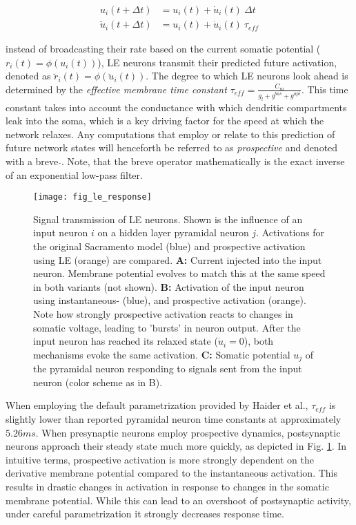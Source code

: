 \begin{align}
  u_i(t+ \Delta t)          & = u_i(t) + \dot{u}_i(t) \ \Delta t \label{eq-r-t-sacramento} \\
  \breve{u}_i(t + \Delta t) & = u_i(t) + \dot{u}_i(t) \ \tau_{eff} \label{eq-r-t-haider}
\end{align}

instead of broadcasting their rate based on the current somatic potential ($r_i(t) = \phi(u_i(t))$), LE neurons transmit
their predicted future activation, denoted as $\breve{r}_i(t) = \phi(\breve{u}_i(t))$. The degree to which LE neurons
look ahead is determined by the \textit{effective membrane time constant} $\tau_{eff} = \frac{C_m}{g_l + g^{bas} +
g^{api}}$. This time constant takes into account the conductance with which dendritic compartments leak into the soma,
which is a key driving factor for the speed at which the network relaxes. Any computations that employ or relate to this
prediction of future network states will henceforth be referred to as \textit{prospective} and denoted with a breve
$\breve{}$. Note, that the breve operator mathematically is the exact inverse of an exponential low-pass filter.


\begin{figure}[h!]
  \centering
  \texttt{[image: fig\_le\_response]}
  \caption[Signal transmission of LE neurons]{Signal transmission of LE neurons. Shown is the influence of an input
    neuron $i$ on a hidden layer pyramidal neuron $j$. Activations for the original Sacramento model (blue) and
    prospective activation using LE (orange) are compared. \textbf{A:} Current injected into the input neuron. Membrane
    potential evolves to match this at the same speed in both variants (not shown). \textbf{B:} Activation of the input
    neuron using instantaneous- (blue), and prospective activation (orange). Note how strongly prospective activation
    reacts to changes in somatic voltage, leading to 'bursts' in neuron output. After the input neuron has reached its
    relaxed state ($\dot{u}_i = 0$), both mechanisms evoke the same activation. \textbf{C:} Somatic potential $u_j$ of
    the pyramidal neuron responding to signals sent from the input neuron (color scheme as in B).}
  \label{fig-comparison-le}
\end{figure}

When employing the default parametrization provided by Haider et al., $\tau_{eff}$ is slightly
lower than reported pyramidal neuron time constants \citep{McCormick1985} at approximately $5.26ms$. When presynaptic
neurons employ prospective dynamics, postsynaptic neurons approach their steady state much more quickly, as depicted in
Fig. \ref{fig-comparison-le}. In intuitive terms, prospective activation is more strongly dependent on the derivative
membrane potential compared to the instantaneous activation. This results in drastic changes in activation in response
to changes in the somatic membrane potential. While this can lead to an overshoot of postsynaptic activity, under
careful parametrization it strongly decreases response time.


